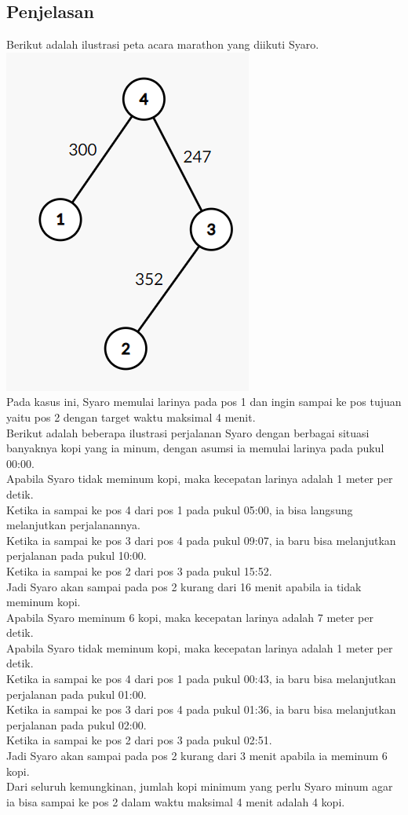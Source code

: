 \documentclass{article}
\begin{document}
\subsection*{Penjelasan}
Berikut adalah ilustrasi peta acara marathon yang diikuti Syaro.\\
\includegraphics[scale=0.6]{graph}\\
Pada kasus ini, Syaro memulai larinya pada pos 1 dan ingin sampai ke pos tujuan yaitu pos 2 dengan target waktu maksimal 4 menit.\\

Berikut adalah beberapa ilustrasi perjalanan Syaro dengan berbagai situasi banyaknya kopi yang ia minum, dengan asumsi ia memulai larinya pada pukul 00:00.\\
Apabila Syaro tidak meminum kopi, maka kecepatan larinya adalah 1 meter per detik.\\
Ketika ia sampai ke pos 4 dari pos 1 pada pukul 05:00, ia bisa langsung melanjutkan perjalanannya.\\
Ketika ia sampai ke pos 3 dari pos 4 pada pukul 09:07, ia baru bisa melanjutkan perjalanan pada pukul 10:00.\\
Ketika ia sampai ke pos 2 dari pos 3 pada pukul 15:52.\\
Jadi Syaro akan sampai pada pos 2 kurang dari 16 menit apabila ia tidak meminum kopi.\\

Apabila Syaro meminum 6 kopi, maka kecepatan larinya adalah 7 meter per detik.\\
Apabila Syaro tidak meminum kopi, maka kecepatan larinya adalah 1 meter per detik.\\
Ketika ia sampai ke pos 4 dari pos 1 pada pukul 00:43, ia baru bisa melanjutkan perjalanan pada pukul 01:00.\\
Ketika ia sampai ke pos 3 dari pos 4 pada pukul 01:36, ia baru bisa melanjutkan perjalanan pada pukul 02:00.\\
Ketika ia sampai ke pos 2 dari pos 3 pada pukul 02:51.\\
Jadi Syaro akan sampai pada pos 2 kurang dari 3 menit apabila ia meminum 6 kopi.\\

Dari seluruh kemungkinan, jumlah kopi minimum yang perlu Syaro minum agar ia bisa sampai ke pos 2 dalam waktu maksimal 4 menit adalah 4 kopi.
\end{document}
